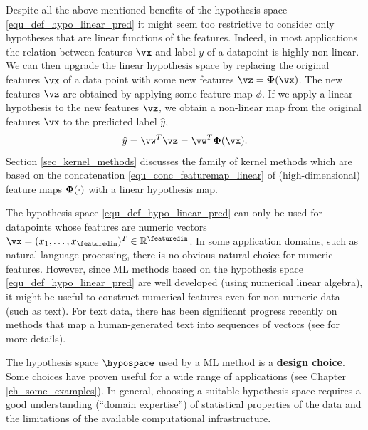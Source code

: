 \documentclass[12pt]{report}
\begin{document}
Despite all the above mentioned benefits of the hypothesis space \eqref{equ_def_hypo_linear_pred} 
it might seem too restrictive to consider only hypotheses that are linear functions 
of the features. Indeed, in most applications the relation between features $\vx$ 
and label $y$ of a datapoint is highly non-linear. We can then upgrade the 
linear hypothesis space by replacing the original features $\vx$ of a data 
point with some new features $\vz = {\bf \Phi} (\vx)$. The new features $\vz$ 
are obtained by applying some feature map $\phi$. If we apply a  
linear hypothesis to the new features $\vz$, we obtain a non-linear 
map from the original features $\vx$ to the predicted label $\hat{y}$, 
\begin{equation}
\label{equ_conc_featuremap_linear}
\hat{y} = \vw^{T} \vz = \vw^{T} {\bf \Phi} (\vx). 
\end{equation} 
Section \ref{sec_kernel_methods} discusses the family of 
kernel methods which are based on the concatenation \eqref{equ_conc_featuremap_linear} of 
(high-dimensional) feature maps ${\bf \Phi}(\cdot)$ 
with a linear hypothesis map. 



The hypothesis space \eqref{equ_def_hypo_linear_pred} can 
only be used for datapoints whose features are numeric 
vectors $\vx = (x_{1},\ldots,x_{\featuredim})^{T} \in \mathbb{R}^{\featuredim}$. 
In some application domains, such as natural language 
processing, there is no obvious natural choice for numeric 
features. However, since ML methods based on the hypothesis 
space \eqref{equ_def_hypo_linear_pred} are well developed 
(using numerical linear algebra), it might be useful to construct 
numerical features even for non-numeric data (such as text). 
For text data, there has been significant progress recently on 
methods that map a human-generated text into sequences of 
vectors (see \cite[Chap. 12]{Goodfellow-et-al-2016} for more details). 

The hypothesis space $\hypospace$ used by a ML method is a {\bf design choice}. 
Some choices have proven useful for a wide range of applications (see Chapter \ref{ch_some_examples}). 
In general, choosing a suitable hypothesis space requires a good 
understanding (``domain expertise'') of statistical properties of 
the data and the limitations of the available computational infrastructure. 
\end{document}
